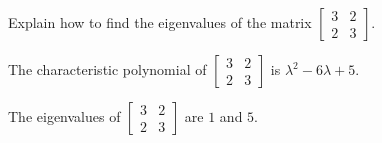 
\begin{exerciseStatement}


Explain how to find the eigenvalues of the matrix \( \left[\begin{array}{cc}
3 & 2 \\
2 & 3
\end{array}\right] \).


\end{exerciseStatement}
    
\begin{exerciseAnswer} 


The characteristic polynomial of \( \left[\begin{array}{cc}
3 & 2 \\
2 & 3
\end{array}\right] \) is \( \lambda^{2} - 6 \lambda + 5 \).



The eigenvalues of \( \left[\begin{array}{cc}
3 & 2 \\
2 & 3
\end{array}\right] \) are \( 1 \) and \( 5 \).


\end{exerciseAnswer}
    

